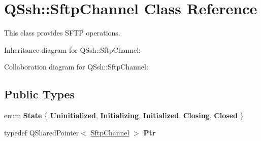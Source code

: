 \hypertarget{class_q_ssh_1_1_sftp_channel}{}\section{Q\+Ssh\+:\+:Sftp\+Channel Class Reference}
\label{class_q_ssh_1_1_sftp_channel}


This class provides S\+F\+TP operations.  




Inheritance diagram for Q\+Ssh\+:\+:Sftp\+Channel\+:


Collaboration diagram for Q\+Ssh\+:\+:Sftp\+Channel\+:
\subsection*{Public Types}
\begin{DoxyCompactItemize}
\item 
\mbox{\label{class_q_ssh_1_1_sftp_channel_a1d9b495d8a65dd7768eef7871307de9e}} 
enum {\bfseries State} \{ \newline
{\bfseries Uninitialized}, 
{\bfseries Initializing}, 
{\bfseries Initialized}, 
{\bfseries Closing}, 
\newline
{\bfseries Closed}
 \}
\item 
\mbox{\label{class_q_ssh_1_1_sftp_channel_a2c9332ee487b98505f3e64c0d76c20d4}} 
typedef Q\+Shared\+Pointer$<$ \mbox{\hyperlink{class_q_ssh_1_1_sftp_channel}{Sftp\+Channel}} $>$ {\bfseries Ptr}
\end{DoxyCompactItemize}
